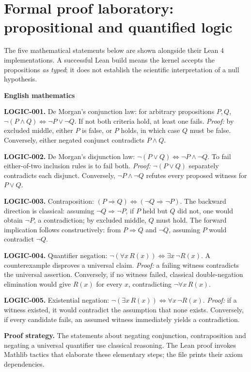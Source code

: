 \section{Formal proof laboratory: propositional and quantified logic}
\label{sec:lean-logic-pilot}
The five mathematical statements below are shown alongside their
Lean 4 implementations. A successful Lean build means the kernel
accepts the propositions \emph{as typed}; it does not establish
the scientific interpretation of a null hypothesis.

\begingroup
\setlength{\columnsep}{0.05\textwidth}
\noindent\begin{minipage}[t]{0.45\textwidth}
\textbf{English mathematics}

\textbf{LOGIC-001.} De Morgan's conjunction law:
for arbitrary propositions $P,Q$,
$\neg(P\land Q)\iff\neg P\lor\neg Q$.
If not both criteria hold, at least one fails. \emph{Proof:} by excluded middle, either $P$ is false, or $P$ holds, in which case $Q$ must be false. Conversely, either negated conjunct contradicts $P\land Q$.

\medskip\textbf{LOGIC-002.} De Morgan's disjunction law:
$\neg(P\lor Q)\iff\neg P\land\neg Q$.
To fail either-of-two inclusion rules is to fail both. \emph{Proof:} $\neg(P\lor Q)$ separately contradicts each disjunct. Conversely, $\neg P\land\neg Q$ refutes every proposed witness for $P\lor Q$.

\medskip\textbf{LOGIC-003.} Contraposition:
$(P\Rightarrow Q)\iff(\neg Q\Rightarrow\neg P)$.
The backward direction is classical: assuming
$\neg Q\Rightarrow\neg P$, if $P$ held but $Q$ did not,
one would obtain $\neg P$, a contradiction; by excluded middle, $Q$ must hold. The forward implication follows constructively: from $P\Rightarrow Q$ and $\neg Q$, assuming $P$ would contradict $\neg Q$.

\medskip\textbf{LOGIC-004.} Quantifier negation:
$\neg(\forall x\,R(x))\iff\exists x\,\neg R(x)$.
A counterexample disproves a universal claim. \emph{Proof:} a failing witness contradicts the universal assertion. Conversely, if no witness failed, classical double-negation elimination would give $R(x)$ for every $x$, contradicting $\neg\forall x\,R(x)$.

\medskip\textbf{LOGIC-005.} Existential negation:
$\neg(\exists x\,R(x))\iff\forall x\,\neg R(x)$. \emph{Proof:} if a witness existed, it would contradict the assumption that none exists. Conversely, if every candidate fails, an assumed witness immediately yields a contradiction.

\medskip\textbf{Proof strategy.} The statements about negating
conjunction, contraposition and negating a universal
quantifier use classical reasoning. The Lean proof
invokes Mathlib tactics that elaborate these elementary
steps; the file prints their axiom dependencies.
\end{minipage}\hfill

